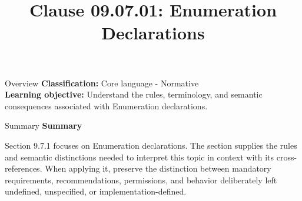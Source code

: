 \documentclass[10pt,letterpaper]{article}
\title{Clause 09.07.01: Enumeration Declarations}
\author{}
\date{}
\begin{document}
\maketitle
\begin{CornellOverviewBox}{Overview}
\textbf{Classification:} Core language - Normative\\[2pt]
\textbf{Learning objective:} Understand the rules, terminology, and semantic consequences associated with Enumeration declarations.
\end{CornellOverviewBox}\begin{CornellSummaryBox}{Summary}
{\sffamily\bfseries\color{Accent} Summary}\par\vspace{3pt}Section 9.7.1 focuses on Enumeration declarations. The section supplies the rules and semantic distinctions needed to interpret this topic in context with its cross-references. When applying it, preserve the distinction between mandatory requirements, recommendations, permissions, and behavior deliberately left undefined, unspecified, or implementation-defined.
\end{CornellSummaryBox}
\end{document}
